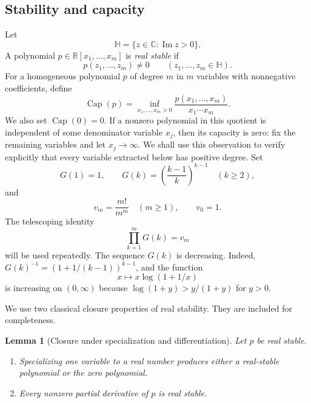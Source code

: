 \documentclass[11pt,a4paper]{article}
\numberwithin{equation}{section}
\newtheorem{lemma}[theorem]{Lemma}
\theoremstyle{definition}
\newcommand{\pcap}{\operatorname{Cap}}
\newcommand{\1}{\mathbf{1}}
\newcommand{\cH}{\mathbb{H}}
\begin{document}
\subsection{Stability and capacity}

Let
\[
 \cH=\{z\in\mathbb C:\operatorname{Im}z>0\}.
\]
A polynomial $p\in\mathbb R[x_1,\dots,x_m]$ is \emph{real stable} if
\[
 p(z_1,\dots,z_m)\ne0
 \qquad(z_1,\dots,z_m\in\cH).
\]
For a homogeneous polynomial $p$ of degree $m$ in $m$ variables with
nonnegative coefficients, define
\[
 \pcap(p)=\inf_{x_1,\dots,x_m>0}
 \frac{p(x_1,\dots,x_m)}{x_1\cdots x_m}.
\]
We also set $\pcap(0)=0$.  If a nonzero polynomial in this quotient is
independent of some denominator variable $x_j$, then its capacity is zero:
fix the remaining variables and let $x_j\to\infty$.  We shall use this
observation to verify explicitly that every variable extracted below has
positive degree.
Set
\[
 G(1)=1,
 \qquad
 G(k)=\left(\frac{k-1}{k}\right)^{k-1}\quad(k\ge2),
\]
and
\[
 v_m=\frac{m!}{m^m}\quad(m\ge1),
 \qquad v_0=1.
\]
The telescoping identity
\begin{equation}\label{eq:telescoping}
 \prod_{k=1}^mG(k)=v_m
\end{equation}
will be used repeatedly.  The sequence $G(k)$ is decreasing.  Indeed,
$G(k)^{-1}=(1+1/(k-1))^{k-1}$, and the function
\[
 x\longmapsto x\log(1+1/x)
\]
is increasing on $(0,\infty)$ because
$\log(1+y)>y/(1+y)$ for $y>0$.

We use two classical closure properties of real stability.  They are included for completeness.

\begin{lemma}[Closure under specialization and differentiation]\label{lem:stability-closure}
Let $p$ be real stable.
\begin{enumerate}[label=\textup{(\roman*)}]
\item Specializing one variable to a real number produces either a real-stable polynomial or the zero polynomial.
\item Every nonzero partial derivative of $p$ is real stable.
\end{enumerate}
\end{lemma}
\end{document}
